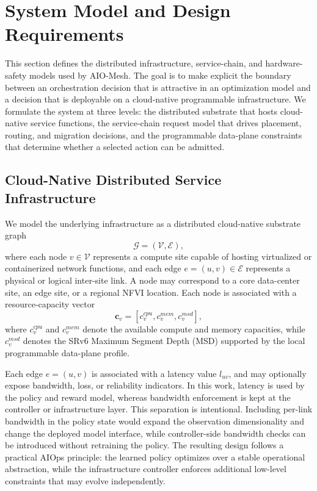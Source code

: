 \documentclass[final,5p]{elsarticle}
\begin{document}
\section{System Model and Design Requirements}
\label{sec:system_model}

This section defines the distributed infrastructure, service-chain, and hardware-safety models used by AIO-Mesh. The goal is to make explicit the boundary between an orchestration decision that is attractive in an optimization model and a decision that is deployable on a cloud-native programmable infrastructure. We formulate the system at three levels: the distributed substrate that hosts cloud-native service functions, the service-chain request model that drives placement, routing, and migration decisions, and the programmable data-plane constraints that determine whether a selected action can be admitted.

\subsection{Cloud-Native Distributed Service Infrastructure}
\label{subsec:infrastructure_model}

We model the underlying infrastructure as a distributed cloud-native substrate graph
\begin{equation}
    \mathcal{G} = (\mathcal{V}, \mathcal{E}),
\end{equation}
where each node \(v \in \mathcal{V}\) represents a compute site capable of hosting virtualized or containerized network functions, and each edge \(e=(u,v) \in \mathcal{E}\) represents a physical or logical inter-site link. A node may correspond to a core data-center site, an edge site, or a regional NFVI location. Each node is associated with a resource-capacity vector
\begin{equation}
    \mathbf{c}_v = \left[c_v^{cpu}, c_v^{mem}, c_v^{msd}\right],
\end{equation}
where \(c_v^{cpu}\) and \(c_v^{mem}\) denote the available compute and memory capacities, while \(c_v^{msd}\) denotes the SRv6 Maximum Segment Depth (MSD) supported by the local programmable data-plane profile.

Each edge \(e=(u,v)\) is associated with a latency value \(l_{uv}\), and may optionally expose bandwidth, loss, or reliability indicators. In this work, latency is used by the policy and reward model, whereas bandwidth enforcement is kept at the controller or infrastructure layer. This separation is intentional. Including per-link bandwidth in the policy state would expand the observation dimensionality and change the deployed model interface, while controller-side bandwidth checks can be introduced without retraining the policy. The resulting design follows a practical AIOps principle: the learned policy optimizes over a stable operational abstraction, while the infrastructure controller enforces additional low-level constraints that may evolve independently.
\end{document}
